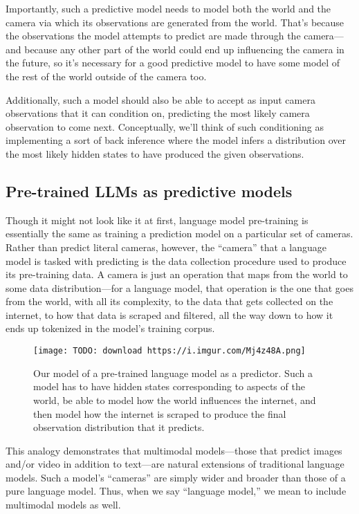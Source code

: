 {Importantly, such a predictive model needs to model both the world and the camera via which its observations are generated from the world. That's because the observations the model attempts to predict are made through the camera---and because any other part of the world could end up influencing the camera in the future, so it's necessary for a good predictive model to have some model of the rest of the world outside of the camera too.

Additionally, such a model should also be able to accept as input camera observations that it can condition on, predicting the most likely camera observation to come next. Conceptually, we'll think of such conditioning as implementing a sort of back inference where the model infers a distribution over the most likely hidden states to have produced the given observations.


\subsection{Pre-trained LLMs as predictive models}

Though it might not look like it at first, language model pre-training is essentially the same as training a prediction model on a particular set of cameras. Rather than predict literal cameras, however, the ``camera'' that a language model is tasked with predicting is the data collection procedure used to produce its pre-training data. A camera is just an operation that maps from the world to some data distribution---for a language model, that operation is the one that goes from the world, with all its complexity, to the data that gets collected on the internet, to how that data is scraped and filtered, all the way down to how it ends up tokenized in the model's training corpus.

\begin{figure}[h!]
  \centering
  \texttt{[image: TODO: download https://i.imgur.com/Mj4z48A.png]}
  \caption{Our model of a pre-trained language model as a predictor. Such a model has to have hidden states corresponding to aspects of the world, be able to model how the world influences the internet, and then model how the internet is scraped to produce the final observation distribution that it predicts.}
\end{figure}

This analogy demonstrates that multimodal models---those that predict images and/or video in addition to text---are natural extensions of traditional language models. Such a model's ``cameras'' are simply wider and broader than those of a pure language model. Thus, when we say ``language model,'' we mean to include multimodal models as well.

}
